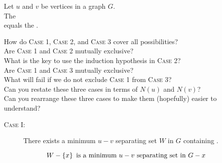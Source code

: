 
\begin{frame}
  \begin{theorem}
    \begin{center}
      Let $u$ and $v$ be  vertices in a graph $G$. \\[5pt]
      The  \\
      equals the .
    \end{center}
  \end{theorem}

  \pause
  \begin{center}
    How do \textsc{Case 1}, \textsc{Case 2}, and \textsc{Case 3} cover all possibilities? \\[8pt] \pause
    Are \textsc{Case 1} and \textsc{Case 2} mutually exclusive? \\[4pt] \pause
    What is the key to use the induction hypothesis in \textsc{Case 2}? \\[8pt] \pause
    Are \textsc{Case 1} and \textsc{Case 3} mutually exclusive? \\[4pt] \pause
    What will fail if we do not exclude \textsc{Case 1} from \textsc{Case 3}? \\[8pt] \pause
    Can you restate these three cases in terms of $N(u)$ and $N(v)$? \\[4pt] \pause
    Can you rearrange these three cases to make them (hopefully) easier to understand?
  \end{center}
\end{frame}

\begin{frame}
  \begin{center}
     \pause
  \end{center}

  \pause
  \begin{description}
    \item[\textsc{Case I}:] There exists a minimum $u-v$ separating set $W$ in $G$ 
      containing .
  \end{description}


  \pause
  \[
    W - \left\{x\right\} \text{ is a minimum } u-v \text{ separating set in } G - x
  \]
\end{frame}

